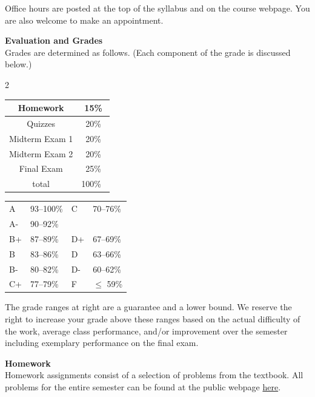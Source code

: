 \documentclass[12pt]{article}
\renewcommand{\emph}[1]{\textsf{\textbf{#1}}}
\newcommand{\localhead}[1]{\par\smallskip\textbf{#1} \smallskip\nobreak\\}%
\def\heading#1{\localhead{\large\emph{#1}}}
\begin{document}
Office hours are posted at the top of the syllabus and on the course webpage. You are also welcome to make an appointment.\\


\heading{Evaluation and Grades}
Grades are determined as follows.  (Each component of the grade is discussed below.)
 
\begin{multicols}{2}
\begin{tabular}{|c|c|}
\hline
Homework & 15\% \\
\hline
Quizzes & 20\% \\
\hline
Midterm Exam 1 & 20\% \\
\hline
Midterm Exam 2 & 20\%  \\
\hline
Final Exam & 25\% \\
\hline
total & 100\% \, \\
\hline
\end{tabular}


\begin{tabular}{llll}
A  & 93--100\%& C  & 70--76\%  \\
A- & 90--92\% & &  \\
B+ & 87--89\% & D+ & 67--69\%  \\
B  & 83--86\% & D  & 63--66\%  \\
B- & 80--82\% & D- & 60--62\%  \\
C+ & 77--79\% & F  & $\le$ 59\%
\end{tabular}
\end{multicols}

The grade ranges at right are a guarantee and a lower bound. We reserve the right to increase your grade above these ranges based on the actual difficulty of the work, average class performance, and/or improvement over the semester including exemplary performance on the final exam. \\

\heading{Homework}
Homework assignments consist of a selection of problems from the textbook.  All problems for the entire semester can be found at the public webpage \href{https://uaf-math.github.io/calc2/homework.html}{here}. 
\end{document}
